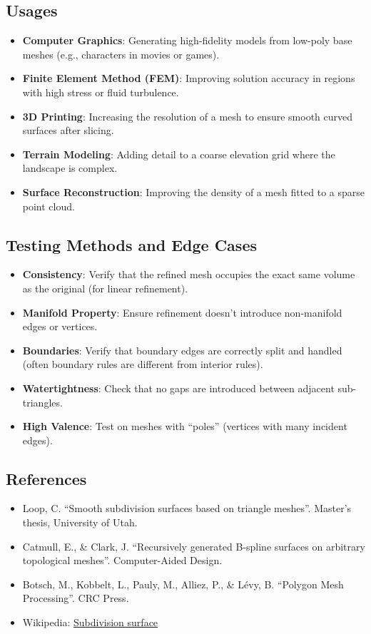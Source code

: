 \subsection{Usages}
\begin{itemize}
\item \textbf{Computer Graphics}: Generating high-fidelity models from low-poly base meshes (e.g., characters in movies or games).
\item \textbf{Finite Element Method (FEM)}: Improving solution accuracy in regions with high stress or fluid turbulence.
\item \textbf{3D Printing}: Increasing the resolution of a mesh to ensure smooth curved surfaces after slicing.
\item \textbf{Terrain Modeling}: Adding detail to a coarse elevation grid where the landscape is complex.
\item \textbf{Surface Reconstruction}: Improving the density of a mesh fitted to a sparse point cloud.
\end{itemize}

\subsection{Testing Methods and Edge Cases}
\begin{itemize}
\item \textbf{Consistency}: Verify that the refined mesh occupies the exact same volume as the original (for linear refinement).
\item \textbf{Manifold Property}: Ensure refinement doesn't introduce non-manifold edges or vertices.
\item \textbf{Boundaries}: Verify that boundary edges are correctly split and handled (often boundary rules are different from interior rules).
\item \textbf{Watertightness}: Check that no gaps are introduced between adjacent sub-triangles.
\item \textbf{High Valence}: Test on meshes with ``poles'' (vertices with many incident edges).
\end{itemize}

\subsection{References}
\begin{itemize}
\item Loop, C. \cite{loop1987} ``Smooth subdivision surfaces based on triangle meshes''. Master's thesis, University of Utah.
\item Catmull, E., \& Clark, J. \cite{catmull1978} ``Recursively generated B-spline surfaces on arbitrary topological meshes''. Computer-Aided Design.
\item Botsch, M., Kobbelt, L., Pauly, M., Alliez, P., \& L\'evy, B. \cite{botsch2010} ``Polygon Mesh Processing''. CRC Press.
\item Wikipedia: \href{https://en.wikipedia.org/wiki/Subdivision_surface}{Subdivision surface}
\end{itemize}

